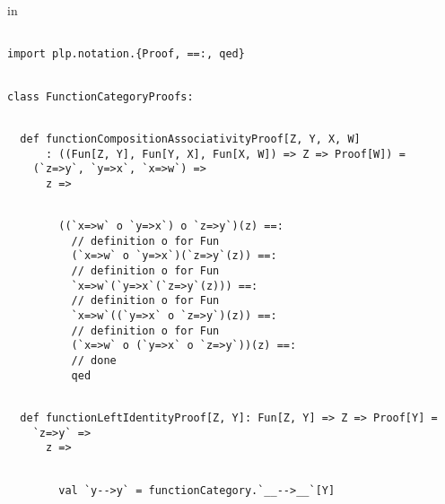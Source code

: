 \documentclass[11pt]{article}
\begin{document}
in

\vspace{6pt}
\begin{mdframed}[backgroundcolor=lightgray!20] 
\begin{lstlisting}

import plp.notation.{Proof, ==:, qed}
\end{lstlisting}
\end{mdframed}
\vspace{6pt}
\begin{mdframed}[backgroundcolor=lightgray!20] 
\begin{lstlisting}

class FunctionCategoryProofs:
\end{lstlisting}
\end{mdframed}
\vspace{6pt}
\begin{mdframed}[backgroundcolor=lightgray!20] 
\begin{lstlisting}
  
  def functionCompositionAssociativityProof[Z, Y, X, W]
      : ((Fun[Z, Y], Fun[Y, X], Fun[X, W]) => Z => Proof[W]) =
    (`z=>y`, `y=>x`, `x=>w`) =>
      z =>   
\end{lstlisting}
\end{mdframed}
\vspace{6pt}
\begin{mdframed}[backgroundcolor=lightgray!20] 
\begin{lstlisting}
        
        ((`x=>w` o `y=>x`) o `z=>y`)(z) ==:
          // definition o for Fun
          (`x=>w` o `y=>x`)(`z=>y`(z)) ==:
          // definition o for Fun
          `x=>w`(`y=>x`(`z=>y`(z))) ==:
          // definition o for Fun
          `x=>w`((`y=>x` o `z=>y`)(z)) ==:
          // definition o for Fun
          (`x=>w` o (`y=>x` o `z=>y`))(z) ==:
          // done
          qed
\end{lstlisting}
\end{mdframed}
\vspace{6pt}
\begin{mdframed}[backgroundcolor=lightgray!20] 
\begin{lstlisting}
  
  def functionLeftIdentityProof[Z, Y]: Fun[Z, Y] => Z => Proof[Y] =
    `z=>y` =>
      z =>
\end{lstlisting}
\end{mdframed}
\vspace{6pt}
\begin{mdframed}[backgroundcolor=lightgray!20] 
\begin{lstlisting}

        val `y-->y` = functionCategory.`__-->__`[Y]
\end{lstlisting}
\end{mdframed}
\end{document}
